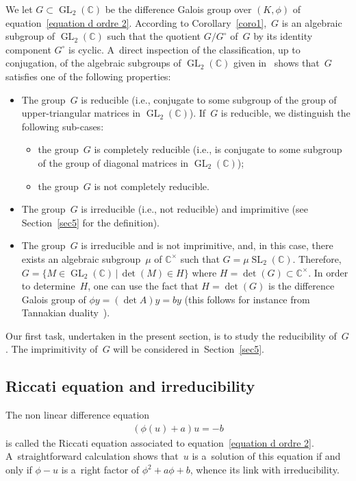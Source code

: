 \documentclass[pdftex]{sigma}
\numberwithin{equation}{section}
\begin{document}
We let $G \subset \operatorname{GL}_{2}(\mathbb C)$ be the dif\/ference Galois group over $(K,\phi)$ of
equation~\eqref{equation d ordre 2}.
According to Corollary~\ref{coro1},~$G$ is an algebraic subgroup of $\operatorname{GL}_{2}(\mathbb C)$ such that the
quotient $G/G^{\circ}$ of~$G$ by its identity component $G^{\circ}$ is cyclic.
A~direct inspection of the classif\/ication, up to conjugation, of the algebraic subgroups of
$\operatorname{GL}_{2}(\mathbb C)$ given in~\cite[Theorem~4]{NvdPT} shows that~$G$ satisf\/ies one of the following
properties:
\begin{itemize}
\itemsep=0pt
\item The group~$G$ is reducible (i.e., conjugate to some subgroup of the group of upper-triangular matrices in
$\operatorname{GL}_{2}(\mathbb C)$).
If~$G$ is reducible, we distinguish the following sub-cases:
\begin{itemize}\itemsep=0pt
\item the group~$G$ is completely reducible (i.e., is conjugate to some subgroup of the group of diagonal matrices
in $\operatorname{GL}_{2}(\mathbb C)$);
\item the group~$G$ is not completely reducible.
\end{itemize}
\item The group~$G$ is irreducible (i.e., not reducible) and imprimitive (see Section~\ref{sec5} for the def\/inition).
\item The group~$G$ is irreducible and is not imprimitive, and, in this case, there exists an algebraic subgroup~$\mu$
of $\mathbb C^{\times}$ such that $G= \mu \operatorname{SL}_{2}(\mathbb C)$.
Therefore, $G= \{M \in \operatorname{GL}_{2}(\mathbb C) \, \vert \, \det(M) \in H\}$ where $H=\det(G) \subset \mathbb
C^{\times}$.
In order to determine~$H$, one can use the fact that $H=\det(G)$ is the dif\/ference Galois group of $\phi y = (\det A) y
= by$ (this follows for instance from Tannakian duality~\cite[Section~1.4]{VdPS97}).
\end{itemize}

Our f\/irst task, undertaken in the present section, is to study the reducibility of~$G$.
The imprimitivity of~$G$ will be considered in~Section~\ref{sec5}.

\subsection{Riccati equation and irreducibility}

The non linear dif\/ference equation
\begin{gather}
\label{eq4}
(\phi(u)+a) u=-b
\end{gather}
is called the Riccati equation associated to equation~\eqref{equation d ordre 2}.
A~straightforward calculation shows that~$u$ is a~solution of this equation if and only if $\phi-u$ is a~right factor of
$\phi^{2}+a\phi+b$, whence its link with irreducibility.
\end{document}
